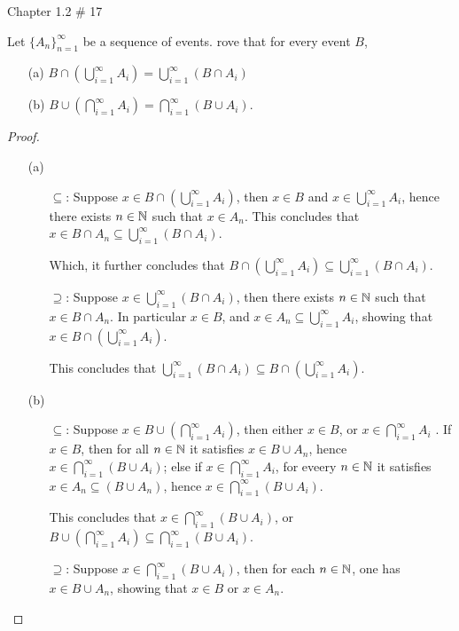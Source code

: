 \documentclass{article}
\begin{document}
\hfil

\begin{ques}\label{q3}
    Chapter 1.2 \# 17

    Let $\{A_n\}_{n=1}^\infty$ be a sequence of events. rove that for every event $B$,
    \begin{itemize}
        \item[(a)] $B\cap (\bigcup_{i=1}^\infty A_i)=\bigcup_{i=1}^\infty(B\cap A_i)$
        \item[(b)] $B\cup (\bigcap_{i=1}^\infty A_i)=\bigcap_{i=1}^\infty(B\cup A_i)$.
    \end{itemize}
\end{ques}

\begin{proof}
    \begin{itemize}
        \item[(a)]
        \begin{itemize}
            \item[$\subseteq$:] Suppose $x\in B\cap (\bigcup_{i=1}^\infty A_i)$, then $x\in B$ and $x\in \bigcup_{i=1}^\infty A_i$, hence there exists $n\in\mathbb{N}$ such that $x\in A_n$. This concludes that $x\in B\cap A_n \subseteq \bigcup_{i=1}^\infty(B\cap A_i)$.
            
            Which, it further concludes that $B\cap (\bigcup_{i=1}^\infty A_i) \subseteq \bigcup_{i=1}^\infty(B\cap A_i)$.
            \item[$\supseteq$:] Suppose $x\in \bigcup_{i=1}^\infty(B\cap A_i)$, then there exists $n\in \mathbb{N}$ such that $x\in B\cap A_n$. In particular $x\in B$, and $x\in A_n\subseteq \bigcup_{i=1}^\infty A_i$, showing that $x\in B\cap (\bigcup_{i=1}^\infty A_i)$.
            
            This concludes that $\bigcup_{i=1}^\infty(B\cap A_i)\subseteq B\cap (\bigcup_{i=1}^\infty A_i)$.
        \end{itemize}
        \item[(b)] 
        \begin{itemize}
            \item[$\subseteq$:] Suppose $x\in B\cup (\bigcap_{i=1}^\infty A_i)$, then either $x\in B$, or $x\in \bigcap_{i=1}^\infty A_i$
            . If $x\in B$, then for all $n\in\mathbb{N}$ it satisfies $x\in B\cup A_n$, hence $x\in \bigcap_{i=1}^\infty(B\cup A_i)$; else if $x\in \bigcap_{i=1}^\infty A_i$, for eveery $n\in\mathbb{N}$ it satisfies $x\in A_n \subseteq (B\cup A_n)$, hence $x\in \bigcap_{i=1}^\infty (B\cup A_i)$.

            This concludes that $x\in \bigcap_{i=1}^\infty(B\cup A_i)$, or $B\cup (\bigcap_{i=1}^\infty A_i) \subseteq \bigcap_{i=1}^\infty(B\cup A_i)$.
            \item[$\supseteq$:] Suppose $x\in \bigcap_{i=1}^\infty (B\cup A_i)$, then for each $n\in \mathbb{N}$, one has $x\in B\cup A_n$, showing that $x\in B$ or $x\in A_n$.
            

\end{itemize}
\end{itemize}
\end{proof}
\end{document}
